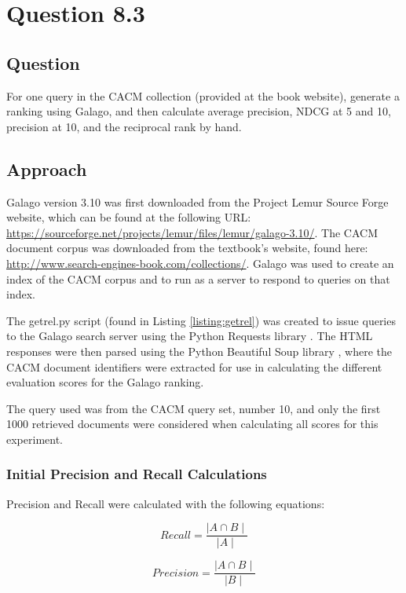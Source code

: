 \section{Question 8.3}


\subsection{Question}
For one query in the CACM collection (provided at the book website), generate a ranking using Galago, and then calculate average precision, NDCG at 5 and 10, precision at 10, and the reciprocal rank by hand.


\subsection{Approach}
Galago version 3.10 was first downloaded from the Project Lemur Source Forge website, which can be found at the following URL: \url{https://sourceforge.net/projects/lemur/files/lemur/galago-3.10/}.  The CACM document corpus was downloaded from the textbook's website, found here: \url{http://www.search-engines-book.com/collections/}.  Galago was used to create an index of the CACM corpus and to run as a server to respond to queries on that index.

The getrel.py script (found in Listing \ref{listing:getrel}) was created to issue queries to the Galago search server using the Python Requests library \cite{py:requests}.  The HTML responses were then parsed using the Python Beautiful Soup library \cite{py:beautifulsoup}, where the CACM document identifiers were extracted for use in calculating the different evaluation scores for the Galago ranking.

The query used was from the CACM query set, number 10, and only the first 1000 retrieved documents were considered when calculating all scores for this experiment.


\subsubsection{Initial Precision and Recall Calculations}
Precision and Recall were calculated with the following equations:

\begin{equation}
\nonumber
Recall = \frac{\mid A \cap B \mid}{\mid A \mid}
\end{equation}

\begin{equation}
\nonumber
Precision = \frac{\mid A \cap B \mid}{\mid B \mid}
\end{equation}


